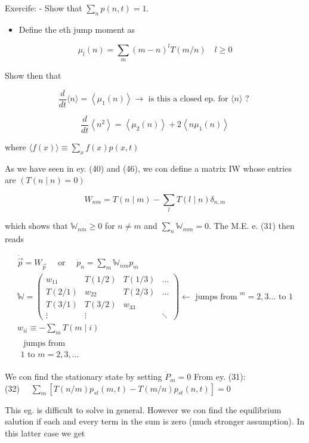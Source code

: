 \documentclass[10pt]{article}
\begin{document}
Exercife: - Show that $\sum_{n} p(n, t)=1$.

\begin{itemize}
  \item Define the eth jump moment as
\end{itemize}

$$
\mu_{l}(n)=\sum_{m}(m-n)^{l} T(m / n) \quad l \geqslant 0
$$

Show then that

$$
\frac{d}{d t}\langle n\rangle=\left\langle\mu_{1}(n)\right\rangle \rightarrow \text { is this a closed ep. for }\langle n\rangle \text { ? }
$$

$$
\frac{d}{d t}\left\langle n^{2}\right\rangle=\left\langle\mu_{2}(n)\right\rangle+2\left\langle n \mu_{1}(n)\right\rangle
$$

where $\langle f(x)\rangle \equiv \sum_{x} f(x) p(x, t)$

As we have seen in ey. (40) and (46), we con define a matrix IW whose entries are $(T(n \mid n)=0)$

$$
W_{n m}=T(n \mid m)-\sum_{l} T(l \mid n) \delta_{n, m}
$$

which shows that $\mathbb{W}_{n m} \geq 0$ for $n \neq m$ and $\sum_{n} \mathbb{W}_{m m}=0$. The M.E. e. (31) then reads

$$
\begin{gathered}
\dot{\vec{p}}=W_{\vec{p}} \quad \text { or } \quad \dot{p}_{n}=\sum_{m} \mathbb{W}_{n m} p_{m} \\
\mathbb{W}=\left(\begin{array}{cccc}
w_{11} & T(1 / 2) & T(1 / 3) & \ldots \\
T(2 / 1) & w_{22} & T(2 / 3) & \ldots \\
T(3 / 1) & T(3 / 2) & w_{33} & \\
\vdots & \vdots & & \ddots
\end{array}\right) \leftarrow \text { jumps from }^{m}=2,3 \ldots \text { to } 1 \\
w_{i i} \equiv-\sum_{m} T(m \mid i) \\
\substack{\text { jumps from } \\
1 \text { to } m=2,3, \ldots}
\end{gathered}
$$

We con find the stationary state by setting $\dot{P}_{m}=0$ From ey. (31):\\
(32) $\quad \sum_{m}\left[T(n / m) p_{s t}(m, t)-T(m / n) p_{s t}(n, t)\right]=0$

This eg. is difficult to solve in general. However we con find the equilibrium salution if each and every term in the sum is zero (much stronger assumption). In this latter case we get
\end{document}
